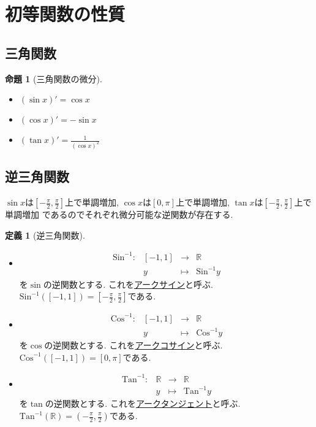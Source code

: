 \documentclass[dvipdfmx,a4paper,11pt]{article}
\newcommand{\R}{\mathbb{R}}
\newcommand{\Sin}{\text{Sin}^{-1}}
\newcommand{\Cos}{\text{Cos}^{-1}}
\newcommand{\Tan}{\text{Tan}^{-1}}
\theoremstyle{definition}
\newtheorem{prop}[thm]{命題}
\newtheorem{dfn}[thm]{定義}
\begin{document}
   
 \section{初等関数の性質}
 \subsection{三角関数}
   
 \begin{tcolorbox}[
    colback = white,
    colframe = green!35!black,
    fonttitle = \bfseries,
    breakable = true]
    \begin{prop}[三角関数の微分]
    \text{}
 \begin{itemize}
 \item  $(\sin x)' = \cos x$ 
 \item  $(\cos x)' = -\sin x$
  \item  $(\tan x)' = \frac{1}{(\cos x)^2}$
 \end{itemize}
 \end{prop}
   \end{tcolorbox}

\subsection{逆三角関数}
$\sin x$は$[- \frac{\pi}{2}, \frac{\pi}{2}]$上で単調増加, 
$\cos x$は$[0, \pi]$上で単調増加, 
$\tan x$は$[- \frac{\pi}{2}, \frac{\pi}{2}]$上で単調増加
であるのでそれぞれ微分可能な逆関数が存在する.

 \begin{tcolorbox}[
    colback = white,
    colframe = green!35!black,
    fonttitle = \bfseries,
    breakable = true]
    \begin{dfn}[逆三角関数]
    \text{}
 \begin{itemize}
 \item    $$
\begin{array}{cccc}
\Sin: &[-1,1]& \rightarrow & \R  \\
&y& \longmapsto & \Sin y
\end{array}
$$
 を$\sin$の逆関数とする. これを\underline{アークサイン}と呼ぶ.
 $\Sin([-1,1])=[- \frac{\pi}{2}, \frac{\pi}{2}]$である.
 \item    $$
\begin{array}{cccc}
\Cos: &[-1,1]& \rightarrow & \R  \\
&y& \longmapsto & \Cos y
\end{array}
$$
 を$\cos$の逆関数とする. これを\underline{アークコサイン}と呼ぶ.
 $\Cos([-1,1])=[0, \pi]$である.
  \item    $$
\begin{array}{cccc}
\Tan: &\R& \rightarrow & \R  \\
&y& \longmapsto & \Tan y
\end{array}
$$
 を$\tan$の逆関数とする. これを\underline{アークタンジェント}と呼ぶ.
 $\Tan(\R)=(- \frac{\pi}{2}, \frac{\pi}{2})$である.
 \end{itemize}
 \end{dfn}
   \end{tcolorbox}
   
\end{document}
